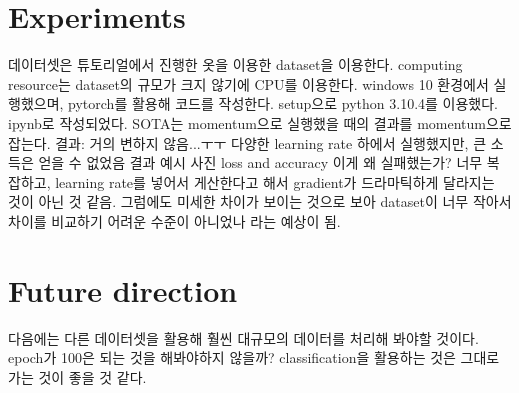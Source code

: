 \documentclass{article}
\begin{document}
\section{Experiments}
데이터셋은 튜토리얼에서 진행한 옷을 이용한 dataset을 이용한다.
computing resource는 dataset의 규모가 크지 않기에 CPU를 이용한다. windows 10 환경에서 실행했으며, pytorch를 활용해 코드를 작성한다.
setup으로 python 3.10.4를 이용했다. ipynb로 작성되었다.
SOTA는 momentum으로 실행했을 때의 결과를 momentum으로 잡는다.
결과: 거의 변하지 않음...ㅜㅜ
다양한 learning rate 하에서 실행했지만, 큰 소득은 얻을 수 없었음
결과 예시 사진 loss and accuracy
이게 왜 실패했는가? 너무 복잡하고, learning rate를 넣어서 게산한다고 해서 gradient가 드라마틱하게 달라지는 것이 아닌 것 같음. 그럼에도 미세한 차이가 보이는 것으로 보아 dataset이 너무 작아서 차이를 비교하기 어려운 수준이 아니었나 라는 예상이 됨.


\section{Future direction}
다음에는 다른 데이터셋을 활용해 훨씬 대규모의 데이터를 처리해 봐야할 것이다. epoch가 100은 되는 것을 해봐야하지 않을까?
classification을 활용하는 것은 그대로 가는 것이 좋을 것 같다.



\clearpage
\end{document}
